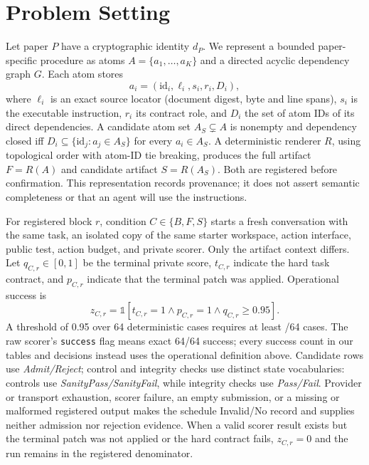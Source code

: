 \documentclass[letterpaper]{article} %
\begin{document}
\section{Problem Setting}

Let paper $P$ have a cryptographic identity $d_P$.  We represent a bounded
paper-specific procedure as atoms $A=\{a_1,\ldots,a_K\}$ and a directed acyclic
dependency graph $G$.  Each atom stores
\begin{equation}
a_i=(\mathrm{id}_i,\ell_i,s_i,r_i,D_i),
\end{equation}
where $\ell_i$ is an exact source locator (document digest, byte and line spans),
$s_i$ is the executable instruction, $r_i$ its contract role, and $D_i$ the set
of atom IDs of its direct dependencies.  A candidate atom set
$A_S\subsetneq A$ is nonempty and dependency closed iff
$D_i\subseteq\{\mathrm{id}_j:a_j\in A_S\}$ for every $a_i\in A_S$.  A deterministic
renderer $R$, using topological order with atom-ID tie breaking, produces the
full artifact $F=R(A)$ and candidate artifact $S=R(A_S)$.  Both are registered
before confirmation.  This representation records provenance; it does not assert
semantic completeness or that an agent will use the instructions.

For registered block $r$, condition $C\in\{B,F,S\}$ starts a fresh conversation
with the same task, an isolated copy of the same starter workspace, action
interface, public test, action budget, and private scorer.  Only the artifact
context differs.  Let $q_{C,r}\in[0,1]$ be the terminal private score,
$t_{C,r}$ indicate the hard task contract, and $p_{C,r}$ indicate that the
terminal patch was applied.  Operational success is
\begin{equation}
z_{C,r}=\mathbb{1}[t_{C,r}=1\land p_{C,r}=1\land q_{C,r}\geq 0.95].
\end{equation}
A threshold of 0.95 over 64 deterministic cases requires at least
\VFourMinimumPassingCases{}/64 cases.
The raw scorer's \texttt{success} flag means exact 64/64 success; every success
count in our tables and decisions instead uses the operational definition above.
Candidate rows use \emph{Admit/Reject}; control and integrity checks use
distinct state vocabularies: controls use \emph{SanityPass/SanityFail}, while
integrity checks use \emph{Pass/Fail}.
Provider or transport exhaustion, scorer failure, an empty
submission, or a missing or malformed registered output makes the schedule
Invalid/No record and supplies neither admission nor rejection evidence.  When a
valid scorer result exists but the terminal patch was not applied or the hard
contract fails, $z_{C,r}=0$ and the run remains in the registered denominator.
\end{document}
